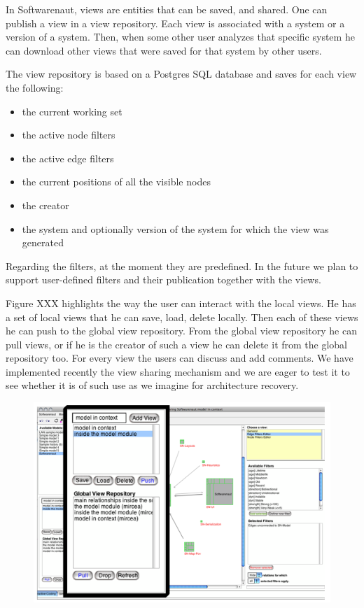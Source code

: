 \documentclass[preprint,12pt]{elsarticle}
\begin{document}
In Softwarenaut, views are entities that can be saved, and shared. One can publish a view in a view repository. Each view is associated with a system or a version of a system. Then, when some other user analyzes that specific system he can download other views that were saved for that system by other users. 

The view repository is based on a Postgres SQL database and saves for each view the following:
\begin{itemize}
\item the current working set
\item the active node filters
\item the active edge filters
\item the current positions of all the visible nodes
\item the creator
\item the system and optionally version of the system for which the view was generated
\end{itemize}

Regarding the filters, at the moment they are predefined. In the future we plan to support user-defined filters and their publication together with the views. 

Figure XXX highlights the way the user can interact with the local views. He has a set of local views that he can save, load, delete locally. Then each of these views he can push to the global view repository. From the global view repository he can pull views, or if he is the creator of such a view he can delete it from the global repository too. For every view the users can discuss and add comments. We have implemented recently the view sharing mechanism and we are eager to test it to see whether it is of such use as we imagine for architecture recovery. 

\begin{figure}[h]
\begin{center}
\includegraphics[width=\linewidth]{images/ViewOperations.png}
\caption{}
\label{}
\end{center}
\end{figure}
\end{document}
